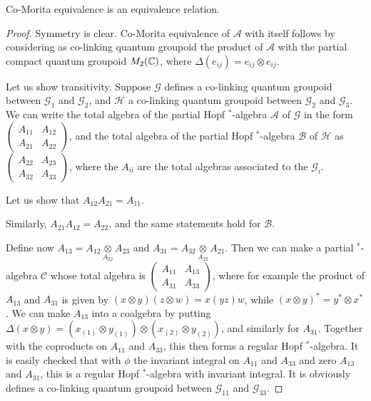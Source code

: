 \begin{Lem} Co-Morita equivalence is an equivalence relation. %
\end{Lem} 
\begin{proof} Symmetry is clear. Co-Morita equivalence of $\mathscr{A}$ with itself follows by considering as co-linking quantum groupoid the product of $\mathscr{A}$ with the partial compact quantum groupoid $M_2(\mathbb{C})$, where $\Delta(e_{ij}) = e_{ij}\otimes e_{ij}$. 

Let us show transitivity. Suppose $\mathscr{G}$ defines a co-linking quantum groupoid between $\mathscr{G}_1$ and $\mathscr{G}_2$, and $\mathscr{H}$ a co-linking quantum groupoid between $\mathscr{G}_2$ and $\mathscr{G}_3$. We can write the total algebra of the partial Hopf $^*$-algebra $\mathscr{A}$ of $\mathscr{G}$ in the form $\begin{pmatrix} A_{11} & A_{12} \\ A_{21} & A_{22}\end{pmatrix}$, and the total algebra of the partial Hopf $^*$-algebra $\mathscr{B}$ of $\mathscr{H}$ as $\begin{pmatrix} A_{22} & A_{23} \\ A_{32} & A_{33}\end{pmatrix}$, where the $A_{ii}$ are the total algebras associated to the $\mathscr{G}_i$. 

Let us show that $A_{12}A_{21} = A_{11}$. 

Similarly,  $A_{21}A_{12} = A_{22}$, and the same statements hold for $\mathscr{B}$. 

Define now $A_{13} = A_{12}\underset{A_{22}}{\otimes} A_{23}$ and $A_{31} = A_{32}\underset{A_{22}}{\otimes} A_{21}$. Then we can make a partial $^*$-algebra $\mathscr{C}$ whose total algebra is $\begin{pmatrix} A_{11} & A_{13}\\ A_{31}& A_{33}\end{pmatrix}$, where for example the product of $A_{13}$ and $A_{31}$ is given by $(x\otimes y)(z\otimes w) =x(yz)w$, while $(x\otimes y)^* = y^*\otimes x^*$. We can make $A_{13}$ into a coalgebra by putting $\Delta(x\otimes y) = (x_{(1)}\otimes y_{(1)})\otimes (x_{(2)}\otimes y_{(2)})$, and similarly for $A_{31}$. Together with the coproducts on $A_{11}$ and $A_{33}$, this then forms a regular Hopf $^*$-algebra. It is easily checked that with $\phi$ the invariant integral on $A_{11}$ and $A_{33}$ and zero $A_{13}$ and $A_{31}$, this is a regular Hopf $^*$-algebra with invariant integral. It is obviously defines a co-linking quantum groupoid between $\mathscr{G}_{11}$ and $\mathscr{G}_{33}$. 
\end{proof} 

